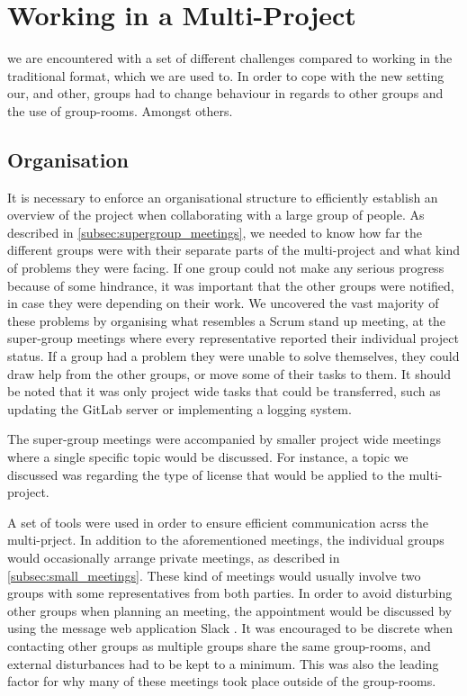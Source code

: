 \section{Working in a Multi-Project}
we are encountered with a set of different challenges compared to working in the traditional format, which we are used to. In order to cope with the new setting our, and other, groups had to change behaviour in regards to other groups and the use of group-rooms. Amongst others.

\subsection*{Organisation}
It is necessary to enforce an organisational structure to efficiently establish an overview of the project when collaborating with a large group of people. As described in \cref{subsec:supergroup_meetings}, we needed to know how far the different groups were with their separate parts of the multi-project and what kind of problems they were facing. If one group could not make any serious progress because of some hindrance, it was important that the other groups were notified, in case they were depending on their work. We uncovered the vast majority of these problems by organising what resembles a Scrum stand up meeting, at the super-group meetings where every representative reported their individual project status. If a group had a problem they were unable to solve themselves, they could draw help from the other groups, or move some of their tasks to them. It should be noted that it was only project wide tasks that could be transferred, such as updating the GitLab server or implementing a logging system.

The super-group meetings were accompanied by smaller project wide meetings where a single specific topic would be discussed. For instance, a topic we discussed was regarding the type of license that would be applied to the multi-project.

A set of tools were used in order to ensure efficient communication acrss the multi-prject. In addition to the aforementioned meetings, the individual groups would occasionally arrange private meetings, as described in \cref{subsec:small_meetings}. These kind of meetings would usually involve two groups with some representatives from both parties. In order to avoid disturbing other groups when planning an meeting, the appointment would be discussed by using the message web application Slack \cite{slack}. It was encouraged to be discrete when contacting other groups as multiple groups share the same group-rooms, and external disturbances had to be kept to a minimum. This was also the leading factor for why many of these meetings took place outside of the group-rooms.

